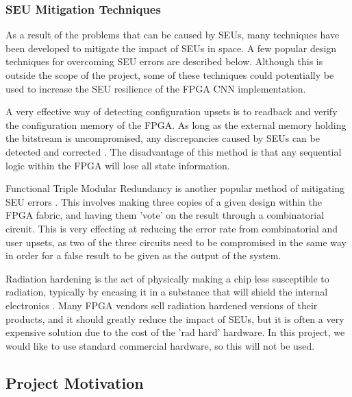 \documentclass[12pt]{article}
\begin{document}
\subsubsection{SEU Mitigation Techniques}
\label{sec:Background-FPGAsAndSpaceApplications-Mitigation}
\vspace{-12pt}

As a result of the problems that can be caused by SEUs, many techniques have been developed to mitigate the impact of SEUs in space. A few popular design techniques for overcoming SEU errors are described below. Although this is outside the scope of the project, some of these techniques could potentially be used to increase the SEU resilience of the FPGA CNN implementation.

A very effective way of detecting configuration upsets is to readback and verify the configuration memory of the FPGA. As long as the external memory holding the bitstream is uncompromised, any discrepancies caused by SEUs can be detected and corrected \cite{SuitabilityGaisler}. The disadvantage of this method is that any sequential logic within the FPGA will lose all state information.

Functional Triple Modular Redundancy is another popular method of mitigating SEU errors \cite{FTripleMR}. This involves making three copies of a given design within the FPGA fabric, and having them 'vote' on the result through a combinatorial circuit. This is very effecting at reducing the error rate from combinatorial and user upsets, as two of the three circuits need to be compromised in the same way in order for a false result to be given as the output of the system.

Radiation hardening is the act of physically making a chip less susceptible to radiation, typically by encasing it in a substance that will shield the internal electronics \cite{RadHardFpga}. Many FPGA vendors sell radiation hardened versions of their products, and it should greatly reduce the impact of SEUs, but it is often a very expensive solution due to the cost of the 'rad hard' hardware. In this project, we would like to use standard commercial hardware, so this will not be used.

\subsection{Project Motivation}
\label{sec:Background-ProjectMotivation}
\vspace{-12pt}

\newpage
\end{document}
